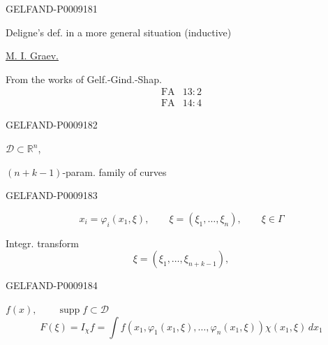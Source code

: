 \begin{GelfandAdjacentEvidence}{GELFAND-P000918}{1}

Deligne's def. in a more general situation (inductive)

\uline{M. I. Graev.}

From the works of Gelf.-Gind.-Shap.
\begin{equation*}
\begin{array}{ll}
 \text{FA} & 13:2\\
 \text{FA} & 14:4
\end{array}
\end{equation*}
\end{GelfandAdjacentEvidence}
\begin{GelfandAdjacentEvidence}{GELFAND-P000918}{2}


$\mathcal D\subset\mathbb R^n$,

$(n+k-1)$-param. family of curves
\end{GelfandAdjacentEvidence}
\begin{GelfandAdjacentEvidence}{GELFAND-P000918}{3}


\begin{equation*}
 x_i=\varphi_i(x_1,\xi),\qquad
 \xi=(\xi_1,\ldots,\xi_n),\qquad \xi\in\Gamma
\end{equation*}

Integr. transform
\begin{equation*}
 \xi=(\xi_1,\ldots,\xi_{n+k-1}),
\end{equation*}
\end{GelfandAdjacentEvidence}
\begin{GelfandAdjacentEvidence}{GELFAND-P000918}{4}

$f(x),\qquad \operatorname{supp}f\subset\mathcal D$
\begin{equation*}
 F(\xi)=I_\chi f
 =\int f(x_1,\varphi_1(x_1,\xi),\ldots,\varphi_n(x_1,\xi))
         \chi(x_1,\xi)\,dx_1
\end{equation*}
\end{GelfandAdjacentEvidence}
